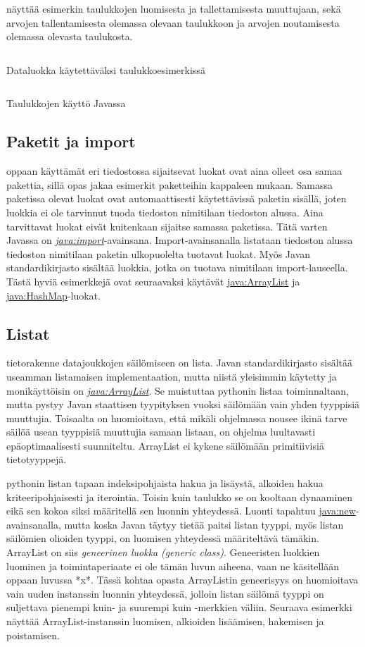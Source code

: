 \documentclass{tufte-book}
\newcommand{\eng}[1]{\textit{(#1)}}
\newcommand{\new}[1]{\textit{\gls{#1}}}
\newcommand{\neweng}[2]{\new{#1} \eng{#2}}
\newcommand{\java}[1]{\underline{\gls{java:#1}}}
\newcommand{\newjava}[1]{\textit{\java{#1}}}
\newcommand{\code}[3]{
\begin{listing}
    \inputminted{java}{OhjelmointiopasEsimerkit/src/#1/#2.java}
    \caption{#3}
    \label{Java-#1-#2}
\end{listing}
}
\begin{document}
 näyttää esimerkin taulukkojen luomisesta ja tallettamisesta
muuttujaan, sekä arvojen tallentamisesta olemassa olevaan taulukkoon ja arvojen noutamisesta
olemassa olevasta taulukosta.

\code{week3/arrayexample}{DataPoint}{Dataluokka käytettäväksi taulukkoesimerkissä}
\code{week3/arrayexample}{Main}{Taulukkojen käyttö Javassa}

\subsection{Paketit ja import}
\label{import}

 oppaan käyttämät eri tiedostossa sijaitsevat luokat ovat aina olleet
osa samaa pakettia, sillä opas jakaa esimerkit paketteihin kappaleen mukaan. Samassa paketissa
olevat luokat ovat automaattisesti käytettävissä paketin sisällä, joten luokkia ei ole tarvinnut
tuoda tiedoston nimitilaan tiedoston alussa. Aina tarvittavat luokat eivät kuitenkaan sijaitse
samassa paketissa. Tätä varten Javassa on \newjava{import}-avainsana. Import-avainsanalla
listataan tiedoston alussa tiedoston nimitilaan paketin ulkopuolelta tuotavat luokat. Myös Javan
standardikirjasto sisältää luokkia, jotka on tuotava nimitilaan import-lauseella. Tästä hyviä
esimerkkejä ovat seuraavaksi käytävät \java{ArrayList} ja \java{HashMap}-luokat.

\subsection{Listat}
\label{listat}

 tietorakenne datajoukkojen säilömiseen on lista. Javan
standardikirjasto sisältää useamman listamaisen implementaation, mutta niistä yleisimmin käytetty 
ja monikäyttöisin on \newjava{ArrayList}. Se muistuttaa pythonin listaa toiminnaltaan, mutta
pystyy Javan staattisen tyypityksen vuoksi säilömään vain yhden tyyppisiä muuttujia. Toisaalta on
huomioitava, että mikäli ohjelmassa nousee ikinä tarve säilöä usean tyyppisiä muuttujia samaan
listaan, on ohjelma luultavasti epäoptimaalisesti suunniteltu. ArrayList ei kykene säilömään
primitiivisiä tietotyyppejä.

\newthought{\java{ArrayList} tukee} pythonin listan tapaan indeksipohjaista hakua ja lisäystä,
alkoiden hakua kriteeripohjaisesti ja iterointia. Toisin kuin taulukko se on kooltaan dynaaminen
eikä sen kokoa siksi määritellä sen luonnin yhteydessä. Luonti tapahtuu \java{new}-avainsanalla,
mutta koska Javan täytyy tietää paitsi listan tyyppi, myös listan säilömien olioiden tyyppi, on
luomisen yhteydessä määriteltävä tämäkin. ArrayList on siis
\neweng{geneerinen luokka}{generic class}. Geneeristen luokkien luominen ja toimintaperiaate
ei ole tämän luvun aiheena, vaan ne käsitellään oppaan luvussa *x*. %
Tässä kohtaa opasta ArrayListin geneerisyys on huomioitava vain uuden instanssin luonnin
yhteydessä, jolloin listan säilömä tyyppi on suljettava pienempi kuin- ja suurempi kuin -merkkien
väliin. Seuraava esimerkki näyttää ArrayList-instanssin luomisen, alkioiden lisäämisen, hakemisen
ja poistamisen.
\end{document}
